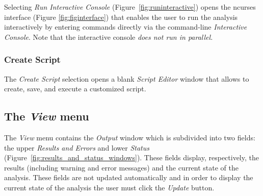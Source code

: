 Selecting \emph{Run Interactive Console} (Figure~\ref{fig:runinteractive}) opens the ncurses interface (Figure \ref{fig:figinterface}) that enables the user to run the analysis interactively by entering
\poy commands directly via the command-line \emph{Interactive
Console}. Note that the interactive console \emph{does not run in parallel.}

\subsubsection{Create Script}
The \emph{Create Script} selection opens a blank \emph{Script Editor} window that allows to create, save, and execute  a customized script.

\subsection{The \emph{View} menu}

The \emph{View} menu contains the \emph{Output} window which is subdivided into two fields: the upper \emph{Results and Errors} and lower \emph{Status} (Figure~\ref{fig:results_and_status_windows}). These fields display, respectively, the results (including warning and error messages) and the current state of the analysis. These fields are not updated automatically and in order to display the current state of the analysis the user must click
the \emph{Update} button.

